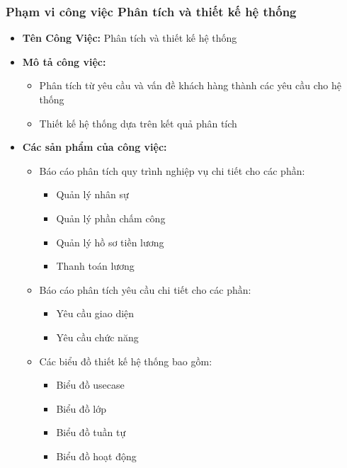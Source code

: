 \subsubsection{Phạm vi công việc Phân tích và thiết kế hệ thống}
\begin{itemize}
    \item \textbf{Tên Công Việc:} Phân tích và thiết kế hệ thống
    \item \textbf{Mô tả công việc:}
          \begin{itemize}
              \item Phân tích từ yêu cầu và vấn đề khách hàng thành các yêu cầu cho hệ thống
              \item Thiết kế hệ thống dựa trên kết quả phân tích
          \end{itemize}
    \item \textbf{Các sản phẩm của công việc:}
          \begin{itemize}
              \item Báo cáo phân tích quy trình nghiệp vụ chi tiết cho các phần:
                    \begin{itemize}
                        \item Quản lý nhân sự
                        \item Quản lý phần chấm công
                        \item Quản lý hồ sơ tiền lương
                        \item Thanh toán lương
                    \end{itemize}
              \item Báo cáo phân tích yêu cầu chi tiết cho các phần:
                    \begin{itemize}
                        \item Yêu cầu giao diện
                        \item Yêu cầu chức năng
                    \end{itemize}
              \item Các biểu đồ thiết kế hệ thống bao gồm:
                    \begin{itemize}
                        \item Biểu đồ usecase
                        \item Biểu đồ lớp
                        \item Biểu đồ tuần tự
                        \item Biểu đồ hoạt động
                    \end{itemize}

\end{itemize}
\end{itemize}
